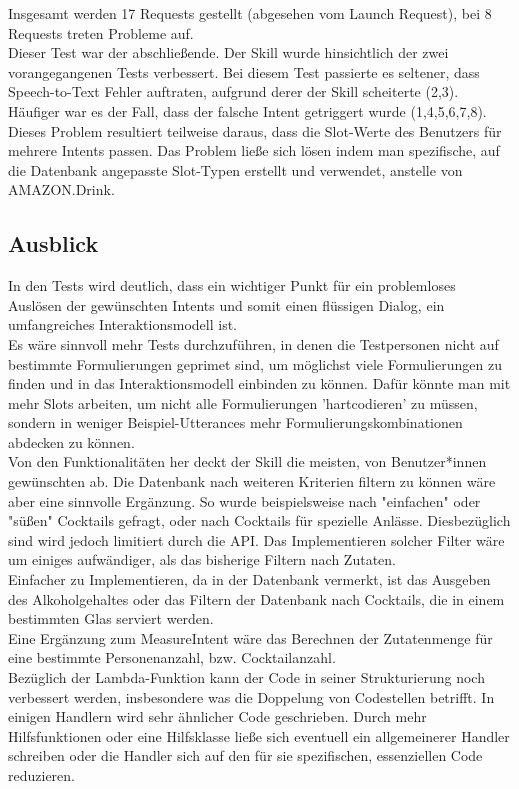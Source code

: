 \documentclass[12pt,letterpaper]{article}
\begin{document}
Insgesamt werden 17 Requests gestellt (abgesehen vom Launch Request), bei 8 Requests treten Probleme auf. \\ Dieser Test war der abschließende. Der Skill wurde hinsichtlich der zwei vorangegangenen Tests verbessert. Bei diesem Test passierte es seltener, dass Speech-to-Text Fehler auftraten, aufgrund derer der Skill scheiterte (2,3). Häufiger war es der Fall, dass der falsche Intent getriggert wurde (1,4,5,6,7,8). \\Dieses Problem resultiert teilweise daraus, dass die Slot-Werte des Benutzers für mehrere Intents passen. Das Problem ließe sich lösen indem man spezifische, auf die Datenbank angepasste Slot-Typen erstellt und verwendet, anstelle von AMAZON.Drink.

\subsection{Ausblick}
In den Tests wird deutlich, dass ein wichtiger Punkt für ein problemloses Auslösen der gewünschten Intents und somit einen flüssigen Dialog, ein umfangreiches Interaktionsmodell ist. \\Es wäre sinnvoll mehr Tests durchzuführen, in denen die Testpersonen nicht auf bestimmte Formulierungen geprimet sind, um möglichst viele Formulierungen zu finden und in das Interaktionsmodell einbinden zu können. Dafür könnte man mit mehr Slots arbeiten, um nicht alle Formulierungen 'hartcodieren' zu müssen, sondern in weniger Beispiel-Utterances mehr Formulierungskombinationen abdecken zu können. \\ Von den Funktionalitäten her deckt der Skill die meisten, von Benutzer*innen gewünschten ab. Die Datenbank nach weiteren Kriterien filtern zu können wäre aber eine sinnvolle Ergänzung. So wurde beispielsweise nach "einfachen" oder "süßen" Cocktails gefragt, oder nach Cocktails für spezielle Anlässe. Diesbezüglich sind wird jedoch limitiert durch die API. Das Implementieren solcher Filter wäre um einiges aufwändiger, als das bisherige Filtern nach Zutaten. \\Einfacher zu Implementieren, da in der Datenbank vermerkt, ist das Ausgeben des Alkoholgehaltes oder das Filtern der Datenbank nach Cocktails, die in einem bestimmten Glas serviert werden. \\ Eine Ergänzung zum MeasureIntent wäre das Berechnen der Zutatenmenge für eine bestimmte Personenanzahl, bzw. Cocktailanzahl.\\
Bezüglich der Lambda-Funktion kann der Code in seiner Strukturierung noch verbessert werden, insbesondere was die Doppelung von Codestellen betrifft. In einigen Handlern wird sehr ähnlicher Code geschrieben. Durch mehr Hilfsfunktionen oder eine Hilfsklasse ließe sich eventuell ein allgemeinerer Handler schreiben oder die Handler sich auf den für sie spezifischen, essenziellen Code reduzieren. 
\end{document}
